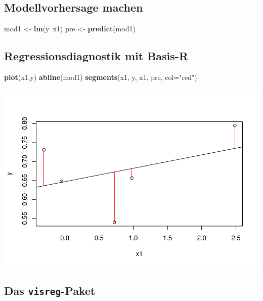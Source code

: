 \documentclass[]{article}
\newenvironment{Shaded}{\begin{snugshade}}{\end{snugshade}}
\newcommand{\KeywordTok}[1]{\textcolor[rgb]{0.13,0.29,0.53}{\textbf{{#1}}}}
\newcommand{\DataTypeTok}[1]{\textcolor[rgb]{0.13,0.29,0.53}{{#1}}}
\newcommand{\StringTok}[1]{\textcolor[rgb]{0.31,0.60,0.02}{{#1}}}
\newcommand{\NormalTok}[1]{{#1}}
\begin{document}
\subsection{Modellvorhersage machen}\label{modellvorhersage-machen}

\begin{Shaded}
\begin{Highlighting}[]
\NormalTok{mod1 <-}\StringTok{ }\KeywordTok{lm}\NormalTok{(y~x1)}
\NormalTok{pre <-}\StringTok{ }\KeywordTok{predict}\NormalTok{(mod1)}
\end{Highlighting}
\end{Shaded}

\subsection{Regressionsdiagnostik mit
Basis-R}\label{regressionsdiagnostik-mit-basis-r-1}

\begin{Shaded}
\begin{Highlighting}[]
\KeywordTok{plot}\NormalTok{(x1,y)}
\KeywordTok{abline}\NormalTok{(mod1)}
\KeywordTok{segments}\NormalTok{(x1, y, x1, pre, }\DataTypeTok{col=}\StringTok{"red"}\NormalTok{)}
\end{Highlighting}
\end{Shaded}

\includegraphics{Intro_Datenanalyse1_files/figure-latex/unnamed-chunk-275-1.pdf}

\subsection{\texorpdfstring{Das
\texttt{visreg}-Paket}{Das visreg-Paket}}\label{das-visreg-paket}
\end{document}
